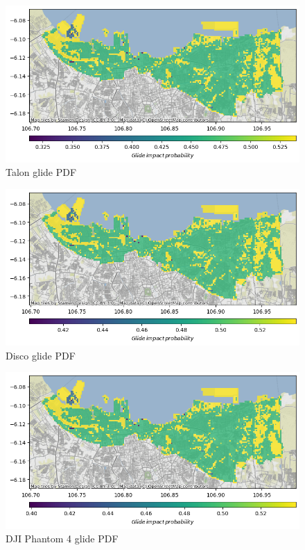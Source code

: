 \documentclass[12pt]{report}
\begin{document}
        \begin{figure}[H]
            \centering
            \includegraphics[width=\textwidth]{Plot/talon/glide_pdf.png}
            \caption{Talon glide PDF}
        \end{figure}
        \begin{figure}[H]
            \centering
            \includegraphics[width=\textwidth]{Plot/parrot/glide_pdf.png}
            \caption{Disco glide PDF}
        \end{figure}
        \begin{figure}[H]
            \centering
            \includegraphics[width=\textwidth]{Plot/phantom4/glide_pdf.png}
            \caption{DJI Phantom 4 glide PDF}
        \end{figure}
\end{document}
